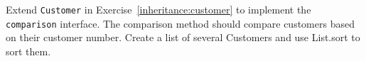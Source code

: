 Extend \lstinline{Customer} in Exercise~\ref{inheritance:customer} to implement the \lstinline{comparison} interface. The comparison method should compare customers based on their customer number. Create a list of several Customers and use List.sort to sort them.